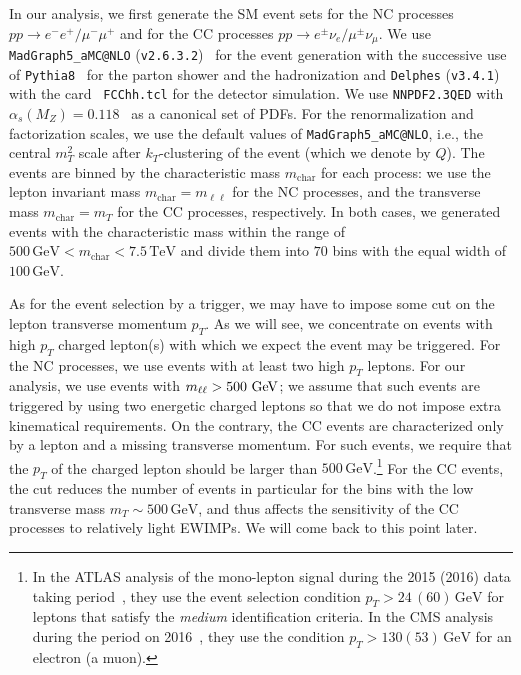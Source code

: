 \documentclass[12pt, a4paper]{article}
\begin{document}
In our analysis, we first generate the SM event sets for the NC
processes $pp\to e^{-}e^{+} / \mu^{-}\mu^{+}$ and for the CC processes
$pp\to e^{\pm}\nu_e / \mu^{\pm}\nu_\mu$.  We use
\texttt{MadGraph5\_aMC@NLO} (\texttt{v2.6.3.2})~\cite{Alwall:2011uj,
Alwall:2014hca} for the event generation with the successive use of
\texttt{Pythia8}~\cite{Sjostrand:2014zea} for the parton shower and
the hadronization and \texttt{Delphes}
(\texttt{v3.4.1})~\cite{deFavereau:2013fsa} with the card {\tt
FCChh.tcl} for the detector simulation.  We use \texttt{NNPDF2.3QED}
with $\alpha_s (M_Z) = 0.118$~\cite{Ball:2013hta} as a canonical set
of PDFs.  For the renormalization and factorization scales, we use the
default values of \texttt{MadGraph5\_aMC@NLO}, i.e., the central
$m_T^2$ scale after $k_T$-clustering of the event (which we denote by
$Q$).  The events are binned by the characteristic mass
$m_{\mathrm{char}}$ for each process: we use the lepton invariant mass
$m_{\mathrm{char}} = m_{\ell\ell}$ for the NC processes, and the
transverse mass $m_{\mathrm{char}} = m_T$ for the CC processes,
respectively.  In both cases, we generated events with the
characteristic mass within the range of $500\,\mathrm{GeV} <
m_\mathrm{char} < 7.5\,\mathrm{TeV}$ and divide them into $70$ bins
with the equal width of $100\,\mathrm{GeV}$.

As for the event selection by a trigger, we may have to impose some cut
on the lepton transverse momentum $p_T$.  As we will see, we concentrate
on events with high $p_T$ charged lepton(s) with which we expect the
event may be triggered.  For the NC processes, we use events with at
least two high $p_T$ leptons.  For our analysis, we use events with
$m_{\ell\ell}>500\ {\rm GeV}$; we assume that such events are triggered
by using two energetic charged leptons so that we do not impose extra
kinematical requirements.  On the contrary, the CC events are
characterized only by a lepton and a missing transverse momentum.  For
such events, we require that the $p_T$ of the charged lepton should be
larger than $500\,\mathrm{GeV}$.\footnote{
In the ATLAS analysis of the mono-lepton signal during the 2015 (2016)
data taking period~\cite{Aaboud:2017efa}, they use the event selection
condition $p_T > 24\, (60)\,\mathrm{GeV}$ for leptons that satisfy the
\textit{medium} identification criteria.  In the CMS analysis during
the period on 2016~\cite{Sirunyan:2018mpc}, they use the condition
$p_T > 130 (53)\, \mathrm{GeV}$ for an electron (a muon).
} For the CC events, the cut reduces the number of events in particular
for the bins with the low transverse mass $m_T \sim 500\, \mathrm{GeV}$,
and thus affects the sensitivity of the CC processes to relatively light
EWIMPs.  We will come back to this point later.
\end{document}
